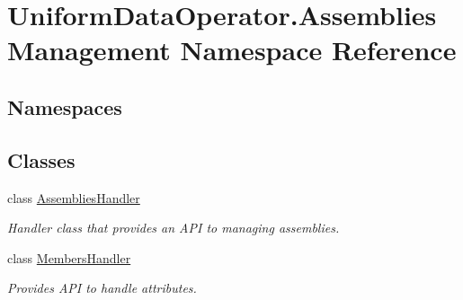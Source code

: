 \hypertarget{namespace_uniform_data_operator_1_1_assemblies_management}{}\section{Uniform\+Data\+Operator.\+Assemblies\+Management Namespace Reference}
\label{namespace_uniform_data_operator_1_1_assemblies_management}
\subsection*{Namespaces}
\begin{DoxyCompactItemize}
\end{DoxyCompactItemize}
\subsection*{Classes}
\begin{DoxyCompactItemize}
\item 
class \mbox{\hyperlink{class_uniform_data_operator_1_1_assemblies_management_1_1_assemblies_handler}{Assemblies\+Handler}}
\begin{DoxyCompactList}\small\item\em Handler class that provides an A\+PI to managing assemblies. \end{DoxyCompactList}\item 
class \mbox{\hyperlink{class_uniform_data_operator_1_1_assemblies_management_1_1_members_handler}{Members\+Handler}}
\begin{DoxyCompactList}\small\item\em Provides A\+PI to handle attributes. \end{DoxyCompactList}\end{DoxyCompactItemize}
